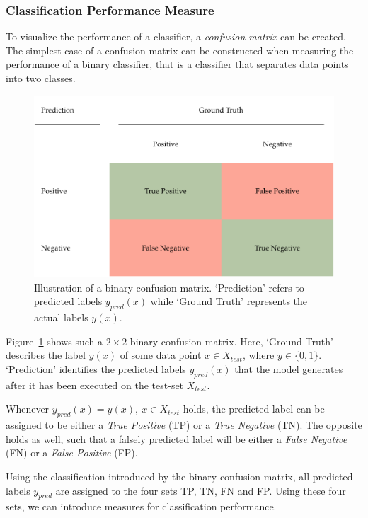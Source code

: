 \subsubsection{Classification Performance Measure}
To visualize the performance of a classifier, a \emph{confusion matrix} can be created.~\cite[p.~2]{THA18}
The simplest case of a confusion matrix can be constructed when measuring the performance of a binary classifier, that is a classifier that separates data points into two classes.
\begin{figure}[ht]
     \centering
     \includegraphics[width=\textwidth]{images/binary-confusion-matrix.pdf}
     \caption{Illustration of a binary confusion matrix.
     `Prediction' refers to predicted labels \(y_{pred}(x)\) while `Ground Truth' represents the actual labels \(y(x)\).}
     \label{fig:confusion-matrix}
 \end{figure}
Figure~\ref{fig:confusion-matrix} shows such a \( 2 \times 2 \) binary confusion matrix.
Here, `Ground Truth' describes the label \(y(x)\) of some data point \(x \in X_{test}\), where \(y \in \{0, 1\}\).
`Prediction' identifies the predicted labels \(y_{pred}(x)\) that the model generates after it has been executed on the test-set \(X_{test}\).

Whenever \(y_{pred}(x) = y(x),~x \in X_{test}\) holds, the predicted label can be assigned to be either a \emph{True Positive} (TP) or a \emph{True Negative} (TN).
The opposite holds as well, such that a falsely predicted label will be either a \emph{False Negative} (FN) or a \emph{False Positive} (FP).~\cite[p.~2]{THA18}

Using the classification introduced by the binary confusion matrix, all predicted labels \(y_{pred}\) are assigned to the four sets TP, TN, FN and FP.
Using these four sets, we can introduce measures for classification performance.

